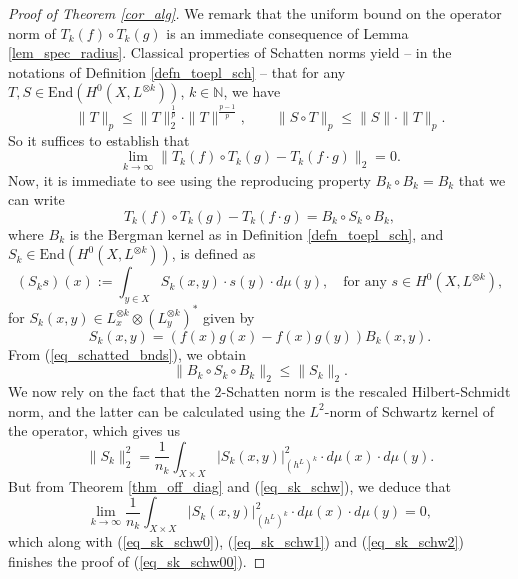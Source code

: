 \documentclass[12pt]{article}
\numberwithin{equation}{section}
\theoremstyle{theorem}
\theoremstyle{definition}
\theoremstyle{remark}
\newcommand{\nat}{\mathbb{N}}
\newcommand{\enmr}[1]{\text{End}{(#1)}}
\begin{document}
	\begin{proof}[Proof of Theorem \ref{cor_alg}]
		We remark that the uniform bound on the operator norm of $T_k(f) \circ T_k(g)$ is an immediate consequence of Lemma \ref{lem_spec_radius}.
		Classical properties of Schatten norms yield -- in the notations of Definition \ref{defn_toepl_sch} -- that for any $T, S \in {\enmr{H^0(X, L^{\otimes k})}}$, $k \in \nat$, we have
		\begin{equation}\label{eq_schatted_bnds}
			\| T \|_p \leq \| T \|_2^{\frac{1}{p}} \cdot  \| T \|^{\frac{p - 1}{p}}, \qquad \| S \circ T \|_p \leq \| S \| \cdot \| T \|_p.
		\end{equation}
		So it suffices to establish that 
		\begin{equation}\label{eq_sk_schw00}
			\lim_{k \to \infty}
			\| T_k(f) \circ T_k(g) - T_k(f \cdot g) \|_2 
			=
			0.
		\end{equation}
		Now, it is immediate to see using the reproducing property $B_k \circ B_k = B_k$ that we can write
		\begin{equation}\label{eq_sk_schw0}
			T_k(f) \circ T_k(g) - T_k(f \cdot g) 
			=
			B_k \circ S_k \circ B_k,
		\end{equation}
		where $B_k$ is the Bergman kernel as in Definition \ref{defn_toepl_sch}, and $S_k \in {\enmr{H^0(X, L^{\otimes k})}}$, is defined as 
		\begin{equation}
			(S_k s)(x) := \int_{y \in X} S_k(x, y) \cdot s(y) \cdot d \mu(y), \quad \text{for any } s \in H^0(X, L^{\otimes k}),
		\end{equation}
		for $S_k(x, y) \in L^{\otimes k}_x \otimes (L^{\otimes k}_y)^*$ given by
		\begin{equation}\label{eq_sk_schw}
			S_k(x, y) = (f(x) g(x) - f(x) g(y)) B_k(x, y).
		\end{equation}
		From (\ref{eq_schatted_bnds}), we obtain
		\begin{equation}\label{eq_sk_schw1}
			\| B_k \circ S_k \circ B_k \|_2 \leq \| S_k \|_2.
		\end{equation}
		We now rely on the fact that the $2$-Schatten norm is the rescaled Hilbert-Schmidt norm, and the latter can be calculated using the $L^2$-norm of Schwartz kernel of the operator, which gives us 
		\begin{equation}\label{eq_sk_schw2}
			\| S_k \|_2^2
			=
			\frac{1}{n_k} \int_{X \times X} |S_k(x, y)|^{2}_{(h^L)^k} \cdot d \mu(x) \cdot d \mu(y).
		\end{equation}
		But from Theorem \ref{thm_off_diag} and (\ref{eq_sk_schw}), we deduce that 
		\begin{equation}
			\lim_{k \to \infty} \frac{1}{n_k} \int_{X \times X} |S_k(x, y)|^{2}_{(h^L)^k} \cdot d \mu(x) \cdot d \mu(y)
			=
			0,
		\end{equation}
		which along with (\ref{eq_sk_schw0}), (\ref{eq_sk_schw1}) and (\ref{eq_sk_schw2}) finishes the proof of (\ref{eq_sk_schw00}).
	\end{proof}	
	
\end{document}
